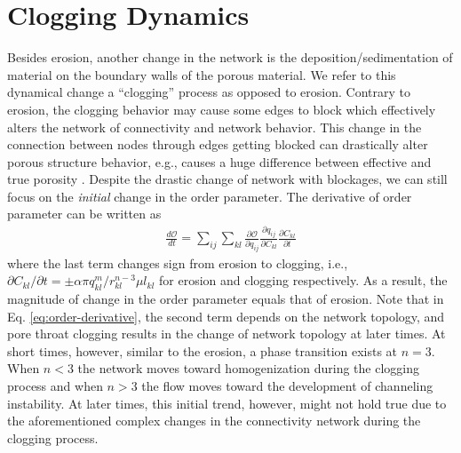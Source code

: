 \documentclass[%
 amsmath,amssymb,
prstper,
]{revtex4-2}
\begin{document}
\section{Clogging Dynamics}
% 
Besides erosion, another change in the network is the deposition/sedimentation of material on the boundary walls of the porous material. We refer to this dynamical change a ``clogging'' process as opposed to erosion. Contrary to erosion, the clogging behavior may cause some edges to block which effectively alters the network of connectivity and network behavior. This change in the connection between nodes through edges getting blocked can drastically alter porous structure behavior, e.g., causes a huge difference between effective and true porosity \cite{shima2021}. Despite the drastic change of network with blockages, we can still focus on the \textit{initial} change in the order parameter. The derivative of order parameter can be written as 
%
\begin{align}
    \frac{d\mathcal{O}}{dt} = \sum_{ij} \sum_{kl} \frac{\partial \mathcal{O}}{\partial q_{ij}} \frac{\partial q_{ij}}{\partial C_{kl}}  \frac{\partial C_{kl}}{\partial t} \label{eq:order-derivative}
\end{align}
%
where the last term changes sign from erosion to clogging, i.e., $\partial C_{kl}/\partial t = \pm \alpha \pi q^m_{kl} /r_{kl}^{n-3}\mu l_{kl}$ for erosion and clogging respectively. As a result, the magnitude of change in the order parameter equals that of erosion. Note that in Eq. \eqref{eq:order-derivative}, the second term depends on the network topology, and pore throat clogging results in the change of network topology at later times.
At short times, however, similar to the erosion, a phase transition exists at $n=3$. When  $n<3$ the network moves toward homogenization during the clogging process and when $n>3$ the flow moves toward the development of channeling instability. At later times, this initial trend, however, might not hold true due to the aforementioned complex changes in the connectivity network during the clogging process. 



\end{document}
